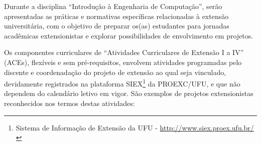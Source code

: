 Durante a disciplina ``Introdução à Engenharia de Computação'', serão apresentadas as práticas e normativas específicas relacionadas à extensão universitária, com o objetivo de preparar os(as) estudantes para jornadas acadêmicas extensionistas e explorar possibilidades de envolvimento em projetos.

Os componentes curriculares de ``Atividades Curriculares de Extensão I a IV'' (ACEs), flexíveis e sem pré-requisitos, envolvem atividades programadas pelo discente e coordenadação do projeto de extensão ao qual seja vinculado, devidamente registrados na plataforma SIEX\footnote{Sistema de Informação de Extensão da UFU - \url{http://www.siex.proex.ufu.br/}} da PROEXC/UFU, e que não dependem do calendário letivo em vigor. São exemplos de projetos extensionistas reconhecidos nos termos destas atividades:

